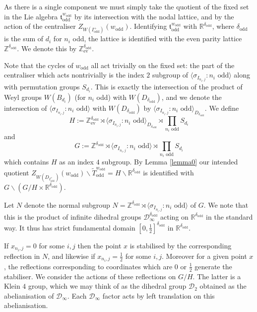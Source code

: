 \documentclass[11pt,a4paper]{article}
\def\D{\mathcal{D}}
\def\t{\mathfrak t}
\def\R{\mathbb{R}}
\def\Z{\mathbb{Z}}
\def\coveringtorus{\tilde{T}}
\def\ev{\mathrm{ev}}
\def\odd{\mathrm{odd}}
\begin{document}
As there is a single component we must simply take the quotient of the fixed set in the Lie algebra $\t_\odd^{w_\odd}$ by its intersection with the nodal lattice, and by the action of the centraliser $Z_{W(I^+_\odd)}(w_\odd)$. Identifying $\t_\odd^{w_\odd}$ with $\R^{\delta_\odd}$, where ${\delta_\odd}$ is the sum of $d_i$ for $n_i$ odd, the lattice is identified with the even parity lattice $\Z^{\delta_\odd}$. We denote this by $\Z^{\delta_\odd}_\ev$.

Note that the cycles of $w_{\odd}$ all act trivially on the fixed set: the part of the centraliser which acts nontrivially is the index $2$ subgroup of $\langle \sigma_{I_{n_i,j}} : n_i \text{ odd} \rangle$ along with permutation groups $S_{d_i}$. This is exactly the intersection of the product of Weyl groups $W(B_{d_i})$ (for $n_i$ odd) with $W(D_{\delta_\odd})$, and we denote the intersection of $\langle \sigma_{I_{n_i,j}} : n_i \text{ odd} \rangle$ with $W(D_{\delta_\odd})$ by $\langle \sigma_{I_{n_i,j}} : n_i \text{ odd} \rangle_{D_{{\delta_\odd}}}$. We define
\[H:=\Z^{\delta_\odd}_\ev \rtimes \langle \sigma_{I_{n_i,j}} : n_i \text{ odd} \rangle_{D_{{\delta_\odd}}}\rtimes \prod_{n_i\text{ odd}} S_{d_i}\]
and
\[G:=\Z^{\delta_\odd} \rtimes \langle \sigma_{I_{n_i,j}} : n_i \text{ odd} \rangle\rtimes \prod_{n_i\text{ odd}} S_{d_i}\]
which contains $H$ as an index $4$ subgroup. By Lemma \ref{lemma0} our intended quotient $Z_{W(D_{I^+_\odd})}(w_\odd)\backslash \coveringtorus_\odd^{w_\odd}=H\backslash \R^{\delta_\odd}$ is identified with $G\backslash (G/H\times \R^{\delta_\odd})$.

\smallskip

Let $N$ denote the normal subgroup $N=\Z^{\delta_\odd} \rtimes \langle \sigma_{I_{n_i,j}} : n_i \text{ odd} \rangle$ of $G$. We note that this is the product of infinite dihedral groups $\D_\infty^{\delta_\odd}$ acting on $\R^{\delta_\odd}$ in the standard way. It thus has strict fundamental domain $[0,\frac 12]^{\delta_\odd}$ in $\R^{\delta_\odd}$.

If $x_{n_i,j}=0$ for some $i,j$ then the point $x$ is stabilised by the corresponding reflection in $N$, and likewise if $x_{n_i,j}=\frac 12$ for some $i,j$. Moreover for a given point $x$, the reflections corresponding to coordinates which are $0$ or $\frac 12$ generate the stabiliser. We consider the actions of these reflections on $G/H$. The latter is a Klein $4$ group, which we may think of as the dihedral group $\D_2$ obtained as the abelianisation of $\D_\infty$. Each $\D_\infty$ factor acts by left translation on this abelianisation.
\end{document}
